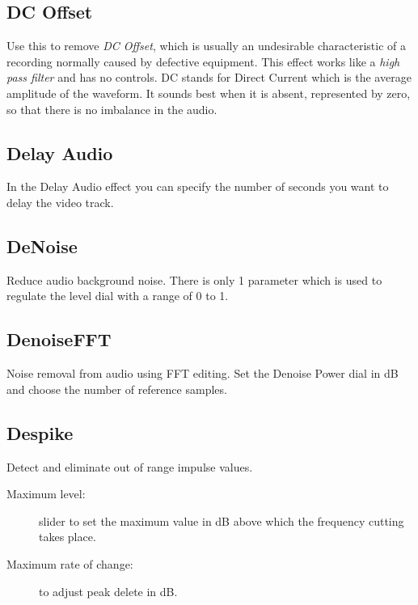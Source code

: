 \subsection{DC Offset}%
\label{sub:dc_offset}

Use this to remove \textit{DC Offset}, which is usually an undesirable characteristic of a recording normally caused by defective equipment. This effect works like a \textit{high pass filter} and has no controls. DC stands for Direct Current which is the average amplitude of the waveform. It sounds best when it is absent, represented by zero, so that there is no imbalance in the audio.

\subsection{Delay Audio}%
\label{sub:delay_audio}

In the Delay Audio effect you can specify the number of seconds you want to delay the video track.

\subsection{DeNoise}%
\label{sub:denoise}

Reduce audio background noise. There is only 1 parameter which is used to regulate the level dial with a range of 0 to 1.

\subsection{DenoiseFFT}%
\label{sub:denoisefft}

Noise removal from audio using FFT editing. Set the Denoise Power dial in dB and choose the number of reference samples.

\subsection{Despike}%
\label{sub:despike}

Detect and eliminate out of range impulse values.

\begin{description}
    \item[Maximum level:] slider to set the maximum value in dB above which the frequency cutting takes place.
    \item[Maximum rate of change:] to adjust peak delete in dB.
\end{description}

